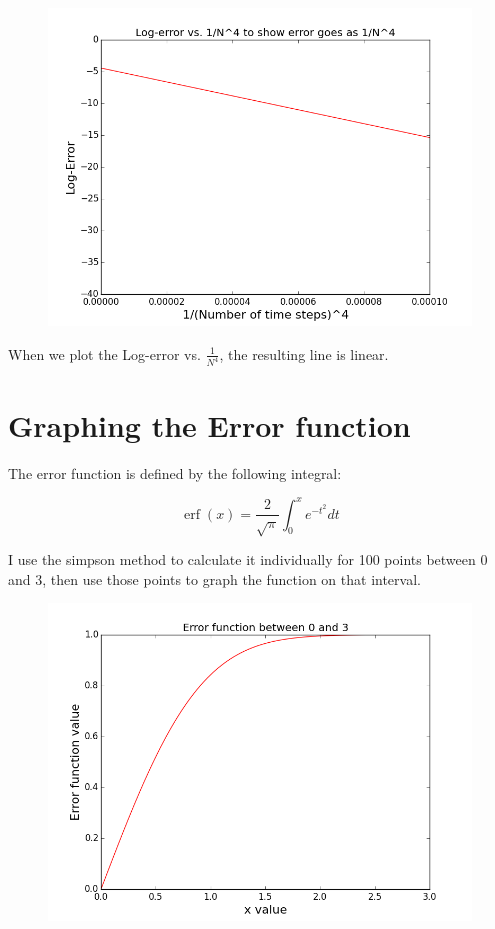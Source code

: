 \documentclass[11pt]{article}
\DeclareMathOperator{\erf}{erf}
\begin{document}
\begin{figure}[ht]
\centering
\includegraphics[scale=.5]{dfs.png}
\end{figure}

When we plot the Log-error vs. $\frac{1}{N^4}$, the resulting line is linear. 

\section{Graphing the Error function}
The error function is defined by the following integral:

\begin{equation}
\erf(x) = \frac{2}{\sqrt{\pi}}\int_0^x e^{-t^2} dt
\end{equation}

I use the simpson method to calculate it individually for 100 points between 0 and 3, then use those points to graph the function on that interval. 

\begin{figure}[ht]
\centering 
\includegraphics[scale=.5]{errf.png}
\end{figure}
\end{document}
